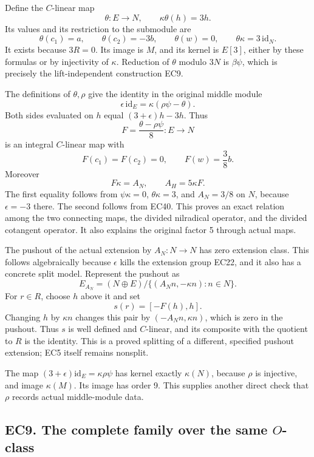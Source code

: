 \documentclass[
  10pt,
  a4paper,
]{article}
\begin{document}
Define the \(C\)-linear map \[
\theta:E\longrightarrow N,\qquad
\kappa\theta(h)=3h.
\tag{EC38}
\] Its values and its restriction to the submodule are \[
\theta(c_1)=a,\qquad
\theta(c_2)=-3b,\qquad
\theta(w)=0,\qquad
\theta\kappa=3\,\mathrm{id}_N.
\tag{EC39}
\] It exists because \(3R=0\). Its image is \(M\), and its kernel is
\(E[3]\), either by these formulas or by injectivity of \(\kappa\).
Reduction of \(\theta\) modulo \(3N\) is \(\beta\psi\), which is
precisely the lift-independent construction EC9.

The definitions of \(\theta,\rho\) give the identity in the original
middle module \[
\epsilon\,\mathrm{id}_E=\kappa(\rho\psi-\theta).
\tag{EC40}
\] Both sides evaluated on \(h\) equal \((3+\epsilon)h-3h\). Thus \[
F=\frac{\theta-\rho\psi}{8}:E\longrightarrow N
\] is an integral \(C\)-linear map with \[
F(c_1)=F(c_2)=0,\qquad F(w)=\frac38b.
\] Moreover \[
F\kappa=A_N,\qquad A_H=5\kappa F.
\tag{EC41}
\] The first equality follows from \(\psi\kappa=0\), \(\theta\kappa=3\),
and \(A_N=3/8\) on \(N\), because \(\epsilon=-3\) there. The second
follows from EC40. This proves an exact relation among the two
connecting maps, the divided nilradical operator, and the divided
cotangent operator. It also explains the original factor 5 through
actual maps.

The pushout of the actual extension by \(A_N:N\to N\) has zero extension
class. This follows algebraically because \(\epsilon\) kills the
extension group EC22, and it also has a concrete split model. Represent
the pushout as \[
E_{A_N}=(N\oplus E)/
\{(A_Nn,-\kappa n):n\in N\}.
\] For \(r\in R\), choose \(h\) above it and set \[
s(r)=[-F(h),h].
\tag{EC42}
\] Changing \(h\) by \(\kappa n\) changes this pair by
\((-A_Nn,\kappa n)\), which is zero in the pushout. Thus \(s\) is well
defined and \(C\)-linear, and its composite with the quotient to \(R\)
is the identity. This is a proved splitting of a different, specified
pushout extension; EC5 itself remains nonsplit.

The map \((3+\epsilon)\mathrm{id}_E=\kappa\rho\psi\) has kernel exactly
\(\kappa(N)\), because \(\rho\) is injective, and image \(\kappa(M)\).
Its image has order 9. This supplies another direct check that \(\rho\)
records actual middle-module data.

\subsection{\texorpdfstring{EC9. The complete family over the same
\(O\)-class}{EC9. The complete family over the same O-class}}\label{ec9.-the-complete-family-over-the-same-o-class}
\end{document}
